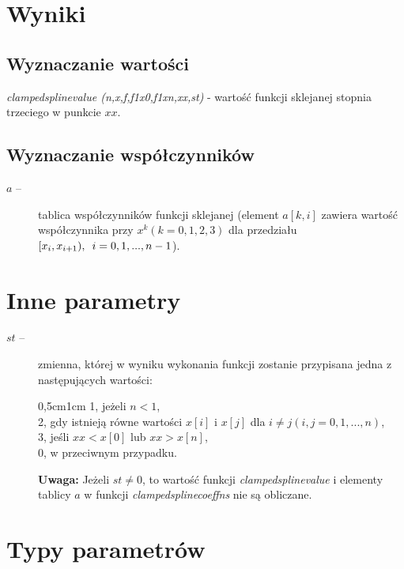 \documentclass[a4paper, 10pt]{article}
\begin{document}
\section{Wyniki}

\subsection*{Wyznaczanie wartości}

\textit{clampedsplinevalue (n,x,f,f1x0,f1xn,xx,st)} - wartość funkcji sklejanej stopnia trzeciego w punkcie $xx$.

\subsection*{Wyznaczanie współczynników}

\begin{description}
\item[$a$ \enskip --] tablica współczynników funkcji sklejanej (element $a[k,i]$ zawiera wartość współczynnika przy $x^k (k=0,1,2,3)$ dla przedziału $[x_i, x_{i+1}),\enskip i=0,1,...,n-1$).
\end{description}

\section{Inne parametry}

\begin{description}
\item[$st$ \enskip --] zmienna, której w wyniku wykonania funkcji zostanie przypisana jedna z następujących wartości:

\begin{changemargin}{0,5cm}{1cm} 
1, jeżeli $n < 1$, \\
2, gdy istnieją równe wartości $x[i]$ i $x[j]$ dla $i \neq j (i,j = 0,1,...,n)$,\\
3, jeśli $xx < x[0]$ lub $xx>x[n]$, \\
0, w przeciwnym przypadku.
\end{changemargin} 

\textbf{Uwaga:} Jeżeli $st \neq 0$, to wartość funkcji \textit{clampedsplinevalue} i elementy tablicy $a$ w funkcji \textit{clampedsplinecoeffns} nie są obliczane.
\end{description}

\section{Typy parametrów}
\end{document}
